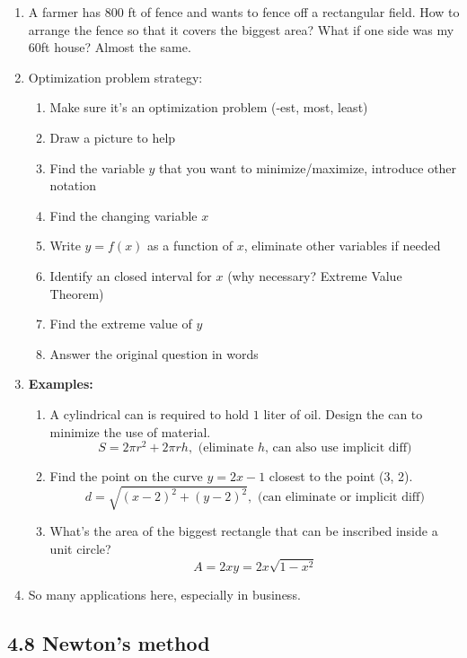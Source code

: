 \documentclass{article}
\begin{document}
\begin{enumerate}
\item A farmer has 800 ft of fence and wants to fence off a rectangular field. How to arrange the fence so that it covers the biggest area? What if one side was my 60ft house? Almost the same.

\item Optimization problem strategy:
\begin{enumerate}
\item Make sure it's an optimization problem (-est, most, least)
\item Draw a picture to help
\item Find the variable $y$ that you want to minimize/maximize, introduce other notation
\item Find the changing variable $x$
\item Write $y = f(x)$ as a function of $x$, eliminate other variables if needed
\item Identify an closed interval for $x$ (why necessary? Extreme Value Theorem)
\item Find the extreme value of $y$
\item Answer the original question in words
\end{enumerate}

\item {\bf Examples:}
\begin{enumerate}
\item A cylindrical can is required to hold $1$ liter of oil. Design the can to minimize the use of material. 
\[
S = 2\pi r^2 + 2\pi r h, \text{ (eliminate $h$, can also use implicit diff)}
\]
\item Find the point on the curve $ y = 2x-1$ closest to the point (3, 2). 
\[
d = \sqrt{(x-2)^2+(y-2)^2}, \text{ (can eliminate or implicit diff)}
\]
\item What's the area of the biggest rectangle that can be inscribed inside a unit circle?
\[
A = 2xy = 2x\sqrt{1-x^2}
\]
\end{enumerate}
\item So many applications here, especially in business.
\end{enumerate}


\subsection{4.8 Newton's method}
\end{document}
